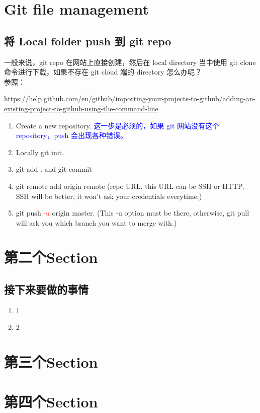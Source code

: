 \documentclass[UTF8,fancyhdr,a4paper]{ctexart}
\begin{document}
\newpage
\section{Git file management}
\subsection{将 Local folder push 到 git repo}
一般来说，git repo 在网站上直接创建，然后在 local directory 当中使用 git clone 命令进行下载，如果不存在 git cloud 端的 directory 怎么办呢？\\
参照：\begin{sloppypar}\url{https://help.github.com/en/github/importing-your-projects-to-github/adding-an-existing-project-to-github-using-the-command-line}\end{sloppypar}
\begin{enumerate}
\item Create a new repository. \textcolor{blue}{这一步是必须的，如果 git 网站没有这个 repository，push 会出现各种错误。}
\item Locally git init.
\item git add . and git commit
\item git remote add origin remote (repo URL, this URL can be SSH or HTTP, SSH will be better, it won't ask your credentials everytime.)
\item git push \textcolor{red}{-u} origin master. (This -u option must be there, otherwise, git pull will ask you which branch you want to merge with.)
\end{enumerate}


\newpage
\section{第二个Section}

\subsection{接下来要做的事情}
\begin{enumerate}
\item 1
\item 2


\end{enumerate}

\newpage
\section{第三个Section}

\newpage
\section{第四个Section}
\end{document}
